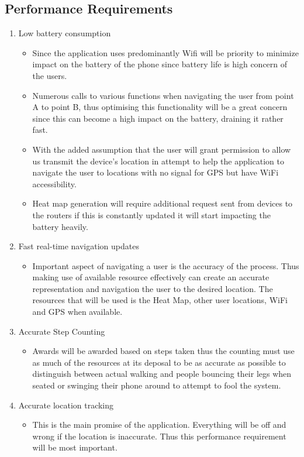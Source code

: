 \documentclass[11pt]{article}
\begin{document}
		\subsection{Performance Requirements}
			\begin{enumerate}
				\item Low battery consumption
					\begin{itemize}
						\item Since the application uses predominantly Wifi will be priority to minimize impact on the battery of the phone since battery life is high concern of the users.   
						\item Numerous calls to various functions when navigating the user from point A to point B, thus optimising this functionality will be a great concern since this can become a high impact on the battery, draining it rather fast.
						\item With the added assumption that the user will grant permission to allow us transmit the device's location in attempt to help the application to navigate the user to locations with no signal for GPS but have WiFi accessibility.
						\item Heat map generation will require additional request sent from devices to the routers if this is constantly updated it will start impacting the battery heavily.
					\end{itemize}
				\item Fast real-time navigation updates
					\begin{itemize}
						\item Important aspect of navigating a user is the accuracy of the process. Thus making use of available resource effectively can create an accurate representation and navigation the user to the desired location. The resources that will be used is the Heat Map, other user locations, WiFi and GPS when available.
					\end{itemize}
				\item Accurate Step Counting
					\begin{itemize}
						\item Awards will be awarded based on steps taken thus the counting must use as much of the resources at its deposal to be as accurate as possible to distinguish between actual walking and people bouncing their legs when seated or swinging their phone around to attempt to fool the system.
					\end{itemize}
				\item Accurate location tracking
					\begin{itemize}
						\item This is the main promise of the application. Everything will be off and wrong if the location is inaccurate. Thus this performance requirement will be most important.
					\end{itemize}  
			\end{enumerate}
\end{document}
